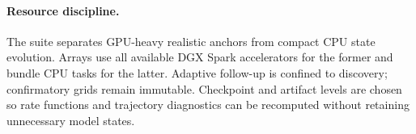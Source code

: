 \paragraph{Resource discipline.}
The suite separates GPU-heavy realistic anchors from compact CPU state evolution.
Arrays use all available DGX Spark accelerators for the former and bundle CPU tasks for the latter. Adaptive
follow-up is confined to discovery; confirmatory grids remain immutable. Checkpoint and
artifact levels are chosen so rate functions and trajectory diagnostics can be recomputed
without retaining unnecessary model states.

